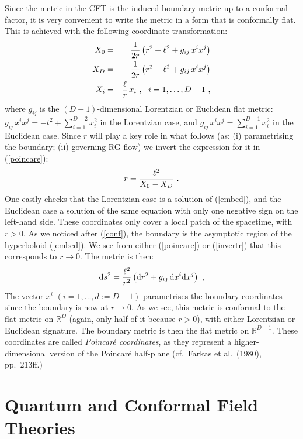 \documentclass[12pt]{article}
\def\nn{\nonumber}
\def\dd{\mbox{d}}
\renewcommand{\^}[1]{\hat{#1}}
\newcommand{\bea}{\begin{eqnarray}}
\newcommand{\eea}{\end{eqnarray}}
\newcommand{\eq}[1]{(\ref{#1})}
\def\nn{\nonumber\\}
\begin{document}
Since the metric in the CFT is the induced boundary metric up to a conformal factor, it is very convenient to write the metric in a form that is conformally flat. This is achieved with the following coordinate transformation:
\bea\label{poincare}
X_0&=&{1\over2r}\left(r^2+\ell^2+g_{ij}\,x^ix^j\right)\nn
X_D&=&{1\over2r}\left(r^2-\ell^2+g_{ij}\,x^ix^j\right)\nn
X_i&=&{\ell\over r}\,x_i~,~~i=1,\ldots,D-1~,
\eea
where $g_{ij}$ is the $(D-1)$-dimensional Lorentzian or Euclidean flat metric: $g_{ij}\, x^i x^j=-t^2+\sum_{i=1}^{D-2} x_i^2$ in the Lorentzian case, and $g_{ij}\,x^ix^j=\sum_{i=1}^{D-1}x_i^2$  in the Euclidean case. Since $r$ will play a key role in what follows (as: (i) parametrising the boundary; (ii) governing RG flow) we invert the expression for it in \eq{poincare}:
\bea\label{invertr}
r={\ell^2\over X_0-X_D}~.
\eea
One easily checks that the Lorentzian case is a solution of \eq{embed}, and the Euclidean case a solution of the same equation with only one negative sign on the left-hand side. These coordinates only cover a local patch of the spacetime, with $r>0$. As we noticed after \eq{conf}, the boundary is the asymptotic region of the hyperboloid \eq{embed}. We see from either \eq{poincare} or \eq{invertr} that this corresponds to $r\rightarrow0$. 
 The metric is then:
\bea\label{metric}
\dd s^2={\ell^2\over r^2}\left(\dd r^2+g_{ij}\,\dd x^i\dd x^j\right)~,
\eea
The vector $x^i$ $(i=1,\ldots,d:=D-1)$ parametrises the boundary coordinates since the boundary is now at $r\rightarrow0$. As we see, this metric is conformal to the flat metric on $\mathbb{R}^D$ (again, only half of it because $r>0$), with either Lorentzian or Euclidean signature. The boundary metric is then the flat metric on $\mathbb{R}^{D-1}$. These coordinates are called {\em Poincar\'e coordinates}, as they represent a higher-dimensional version of the Poincar\'e half-plane (cf.~Farkas et al.~(1980), pp.~213ff.)


\section{Quantum and Conformal Field Theories}\label{qcftrecap}
\end{document}
